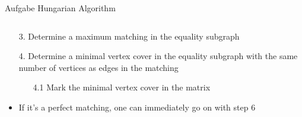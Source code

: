 \begin{frame}[allowframebreaks]{Aufgabe \thesection}{Hungarian Algorithm}
\begin{solutionnoinc}
\begin{columns}
\begin{column}{0.5\textwidth}
{\begin{tasktwocolumn}
            \end{tasktwocolumn}
        }
      \end{column}
      \begin{column}{0.5\textwidth}
      \end{column}
    \end{columns}
  \end{solutionnoinc}
\begin{solutionnoinc}
  \begin{itemize}
    \item[3.] Determine a maximum matching in the equality subgraph
    \item[4.] Determine a minimal vertex cover in the equality subgraph with the same number of vertices as edges in the matching
    \begin{itemize}
      \item[4.1] Mark the minimal vertex cover in the matrix
    \end{itemize}
    \item If it's a perfect matching, one can immediately go on with step 6
  \end{itemize}
  \begin{columns}
    \begin{column}{0.5\textwidth}
      \centering
\end{column}
\end{columns}
\end{solutionnoinc}
\end{frame}
